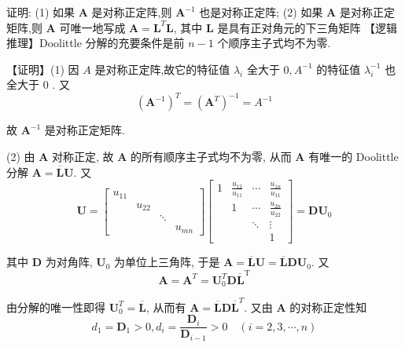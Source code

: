   \begin{tcolorbox}[enhanced,colback=10,colframe=9,breakable,coltitle=green!25!black,title=2024]
  
证明: (1) 如果 $ \boldsymbol{A} $ 是对称正定阵,则 $ \boldsymbol{A}^{-1} $ 也是对称正定阵;
(2) 如果 $ \boldsymbol{A} $ 是对称正定矩阵,则 $ \boldsymbol{A} $ 可唯一地写成 $ \boldsymbol{A}=\boldsymbol{L}^{T} \boldsymbol{L} $, 其中 $ \boldsymbol{L} $ 是具有正对角元的下三角矩阵
\tcblower
【逻辑推理】Doolittle 分解的充要条件是前 $ n-1 $ 个顺序主子式均不为零.

【证明】(1) 因 $ A $ 是对称正定阵,故它的特征值 $ \lambda_{i} $ 全大于 $ 0, A^{-1} $ 的特征值 $ \lambda_{i}^{-1} $ 也全大于 0 . 又
$$
\left(\boldsymbol{A}^{-1}\right)^{T}=\left(\boldsymbol{A}^{T}\right)^{-1}=A^{-1}
$$

故 $ \boldsymbol{A}^{-1} $ 是对称正定矩阵.

(2) 由 $ \boldsymbol{A} $ 对称正定, 故 $ \boldsymbol{A} $ 的所有顺序主子式均不为零, 从而 $ \boldsymbol{A} $ 有唯一的 Doolittle 分解 $ \boldsymbol{A}=\overline{\boldsymbol{L}}\boldsymbol{U} $. 又
$$
\boldsymbol{U}=\left[\begin{array}{cccc}
u_{11} & & & \\
& u_{22} & & \\
& & \ddots & \\
& & & u_{m n}
\end{array}\right]\left[\begin{array}{cccc}
1 & \frac{u_{12}}{u_{11}} & \cdots & \frac{u_{1 n}}{u_{11}} \\
& 1 & \cdots & \frac{u_{2 n}}{u_{22}} \\
& & \ddots & \vdots \\
& & & 1
\end{array}\right]=\boldsymbol{D} \boldsymbol{U}_{0}
$$

其中 $ \boldsymbol{D} $ 为对角阵, $ \boldsymbol{U}_{0} $ 为单位上三角阵, 于是 $ \boldsymbol{A}=\overline{\boldsymbol{L}}\boldsymbol{U}=\overline{\boldsymbol{L}} \boldsymbol{D} \boldsymbol{U}_{0} $. 又
$$
\boldsymbol{A}=\boldsymbol{A}^{T}=\boldsymbol{U}_{0}^{T} {\boldsymbol{D}} \overline{\boldsymbol{L}}^{\mathrm{T}}
$$

由分解的唯一性即得 $ \boldsymbol{U}_{0}^{T}=\overline{\boldsymbol{L}} $,
从而有 $ \boldsymbol{A}=\overline{\boldsymbol{L}} \boldsymbol{D} \overline{\boldsymbol{L}}^{T} $.
又由 $ \boldsymbol{A} $ 的对称正定性知
$$d_{1}=\boldsymbol{D}_{1}>0, d_{i}= \frac{\boldsymbol{D}_{i}}{\boldsymbol{D}_{i-1}}>0 \quad(i=2,3, \cdots, n) $$



\end{tcolorbox}
